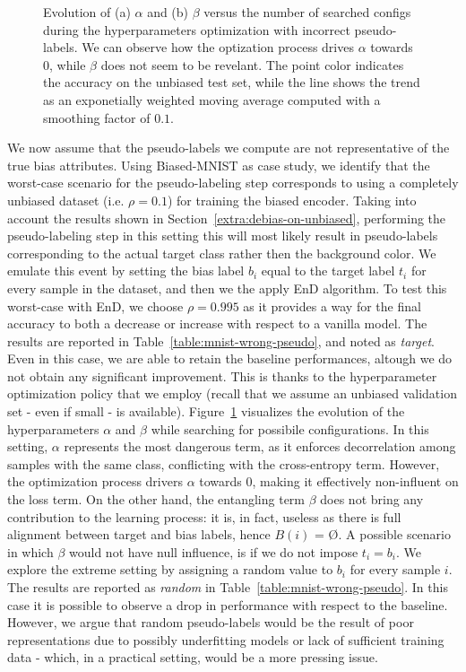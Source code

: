\begin{figure}
    \caption{{Evolution of (a) $\alpha$ and (b) $\beta$ versus the number of searched configs} during the hyperparameters optimization with incorrect pseudo-labels. We can observe how the optization process drives $\alpha$ towards 0, while $\beta$ does not seem to be revelant. The point color indicates the accuracy on the unbiased test set, while the line shows the trend as an exponetially weighted moving average computed with a smoothing factor of $0.1$.}
    \label{fig:alpha-beta-vs-time}
\end{figure}

We now assume that the pseudo-labels we compute are not representative of the true bias attributes. 
Using Biased-MNIST as case study, we identify that the worst-case scenario for the pseudo-labeling step corresponds to using a completely unbiased dataset (i.e. $\rho=0.1$) for training the biased encoder.
Taking into account the results shown in Section~\ref{extra:debias-on-unbiased}, performing the pseudo-labeling step in this setting this will most likely result in pseudo-labels corresponding to the actual target class rather then the background color.
We emulate this event by setting the bias label $b_i$ equal to the target label $t_i$ for every sample in the dataset, and then we the apply EnD algorithm. 
To test this worst-case with EnD, we choose $\rho=0.995$ as it provides a way for the final accuracy to both a decrease or increase with respect to a vanilla model. 
The results are reported in Table~\ref{table:mnist-wrong-pseudo}, and noted as \emph{target}. Even in this case, we are able to retain the baseline performances, altough we do not obtain any significant improvement. 
This is thanks to the hyperparameter optimization policy that we employ (recall that we assume an unbiased validation set - even if small - is available). 
Figure~\ref{fig:alpha-beta-vs-time} visualizes the evolution of the hyperparameters $\alpha$ and $\beta$ while searching for possibile configurations. 
In this setting, $\alpha$ represents the most dangerous term, as it enforces decorrelation among samples with the same class, conflicting with the cross-entropy term. 
However, the optimization process drivers $\alpha$ towards 0, making it effectively non-influent on the loss term. 
On the other hand, the entangling term $\beta$ does not bring any contribution to the learning process: it is, in fact, useless as there is full alignment between target and bias labels, hence $B(i)$ = \O. 
A possible scenario in which $\beta$ would not have null influence, is if we do not impose $t_i = b_i$. 
We explore the extreme setting by assigning a random value to $b_i$ for every sample $i$. The results are reported as \emph{random} in Table~\ref{table:mnist-wrong-pseudo}. In this case it is possible to observe a drop in performance with respect to the baseline. However, we argue that random pseudo-labels would be the result of poor representations due to possibly underfitting models or lack of sufficient training data - which, in a practical setting, would be a more pressing issue. 